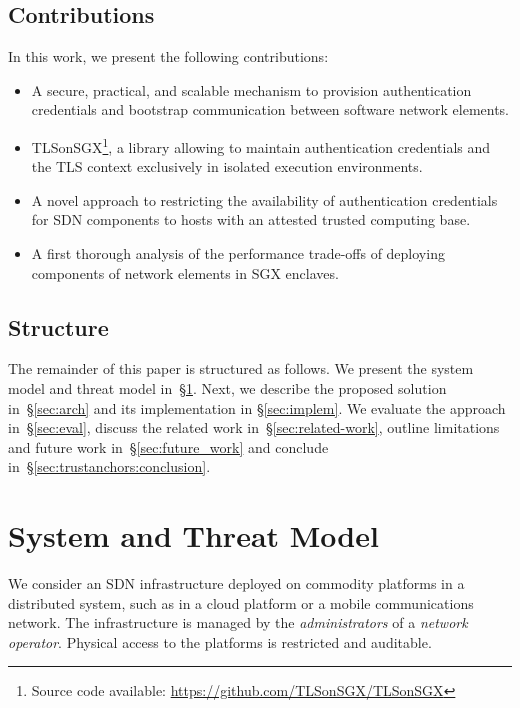 {\subsection{Contributions}
\label{subsec:contrib}
In this work, we present the following contributions:
\begin{itemize}
	\item A secure, practical, and scalable mechanism to provision authentication credentials and bootstrap communication between software network elements.
	\item TLSonSGX\footnote{Source code available: \url{https://github.com/TLSonSGX/TLSonSGX}}, a library allowing to maintain authentication credentials and the TLS context exclusively in isolated execution environments. 
	\item A novel approach to restricting the availability of authentication credentials for SDN components to hosts with an attested trusted computing base.
	\item A first thorough analysis of the performance trade-offs of deploying components of network elements in SGX enclaves.
\end{itemize}

\subsection{Structure}
\label{subsec:structure}
The remainder of this paper is structured as follows.
We present the system model and threat model in~\S\ref{sec:sys-threat-mod}.
Next, we describe the proposed solution in~\S\ref{sec:arch} and its implementation in \S\ref{sec:implem}.
We evaluate the approach in~\S\ref{sec:eval}, discuss the related work in~\S\ref{sec:related-work}, outline limitations and future work in~\S\ref{sec:future_work} and conclude in~\S\ref{sec:trustanchors:conclusion}.

\section{System and Threat Model}
\label{sec:sys-threat-mod}
We consider an SDN infrastructure deployed on commodity platforms in a distributed system, such as in a cloud platform or a mobile communications network.
The infrastructure is managed by the \textit{administrators} of a \textit{network operator}.
Physical access to the platforms is restricted and auditable.

}
